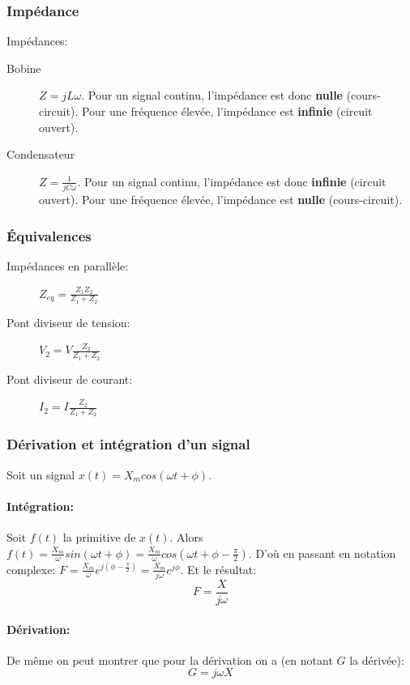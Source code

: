 \documentclass[10pt,a4paper]{article}
\begin{document}
\subsubsection{Impédance}
Impédances:
\begin{description}
\item[Bobine] $Z = jL\omega$. Pour un signal continu, l'impédance est donc \textbf{nulle} (cours-circuit). Pour une fréquence élevée, l'impédance est \textbf{infinie} (circuit ouvert).
\item[Condensateur] $Z = \frac{1}{jC\omega}$.  Pour un signal continu, l'impédance est donc \textbf{infinie} (circuit ouvert). Pour une fréquence élevée, l'impédance est \textbf{nulle} (cours-circuit).
\end{description}

\subsubsection{Équivalences}
\begin{description}
\item[Impédances en parallèle: ] $Z_{eq} = \frac{Z_{1}Z_{2}}{Z_{1} + Z_{2}}$
\item[Pont diviseur de tension: ] $V_{2} = V\frac{Z_{2}}{Z_{1} + Z_{2}}$
\item[Pont diviseur de courant: ] $I_{2} = I\frac{Z_{2}}{Z_{1} + Z_{2}}$
\end{description}

\subsubsection{Dérivation et intégration d'un signal}
Soit un signal $x(t) = X_{m} cos(\omega t + \phi)$.
\paragraph{Intégration: } Soit $f(t)$ la primitive de $x(t)$. Alors $f(t) = \frac{X_{m}}{\omega} sin(\omega t + \phi) =  \frac{X_{m}}{\omega} cos(\omega t + \phi - \frac{\pi}{2})$. D'où en passant en notation complexe: $F = \frac{X_{m}}{\omega} e^{j(\phi - \frac{\pi}{2})} = \frac{X_{m}}{j\omega} e^{j\phi}$. Et le résultat:
\begin{equation}
F = \frac{X}{j\omega}
\end{equation}
\paragraph{Dérivation: } De même on peut montrer que pour la dérivation on a (en notant $G$ la dérivée):
\begin{equation}
G = j\omega X
\end{equation}
\end{document}
